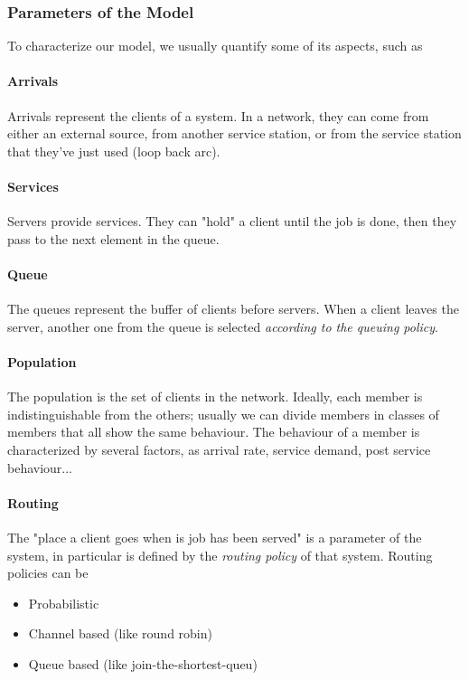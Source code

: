 \documentclass[10pt,a4paper]{article}
\begin{document}
				\subsubsection{Parameters of the Model}
					To characterize our model, we usually quantify some of its aspects, such as
					
					\paragraph{Arrivals}
						Arrivals represent the clients of a system. In a network, they can come from either an external source, from another service station, or from the service station that they've just used (loop back arc).
						
					\paragraph{Services}
						Servers provide services. They can "hold" a client until the job is done, then they pass to the next element in the queue.
						
					\paragraph{Queue}
						The queues represent the buffer of clients before servers. When a client leaves the server, another one from the queue is selected \emph{according to the queuing policy}.
						
					\paragraph{Population}
						The population is the set of clients in the network. Ideally, each member is indistinguishable from the others; usually we can divide members in classes of members that all show the same behaviour. The behaviour of a member is characterized by several factors, as arrival rate, service demand, post service behaviour...
						
					\paragraph{Routing}
						The "place a client goes when is job has been served" is a parameter of the system, in particular is defined by the \emph{routing policy} of that system. Routing policies can be
						\begin{itemize}
							\item Probabilistic
							\item Channel based (like round robin)
							\item Queue based (like join-the-shortest-queu)
						\end{itemize}
			
\end{document}
